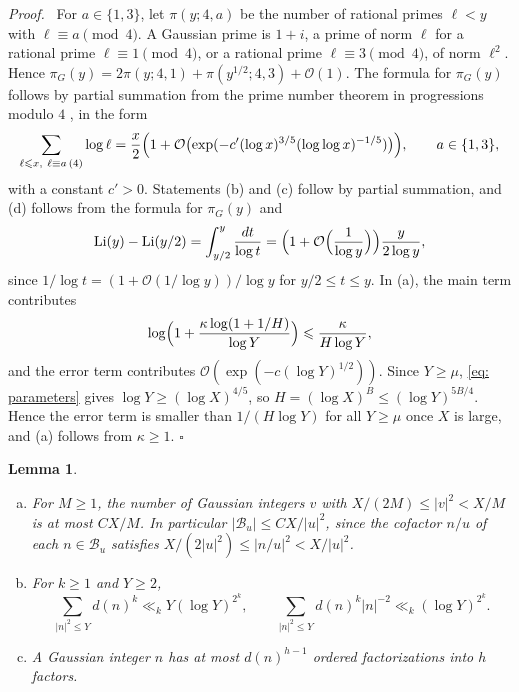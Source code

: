\documentclass{article}
\numberwithin{equation}{section}
\newtheorem{lemma}{Lemma}
\newenvironment{proof}[1][Proof]{\par\medskip\noindent\textit{#1.}\ }{\hfill$\square$\par\medskip}
\newcommand{\Le}{\leqslant}
\newcommand{\Ge}{\geqslant}
\begin{document}
\begin{proof}
For $a \in \{1, 3\}$, let $\pi(y; 4, a)$ be the number of rational primes $\ell < y$ with $\ell \equiv a \pmod 4$. A Gaussian prime is $1 + i$, a prime of norm $\ell$ for a rational prime $\ell \equiv 1 \pmod 4$, or a rational prime $\ell \equiv 3 \pmod 4$, of norm $\ell^2$. Hence $\pi_G(y) = 2\pi(y; 4, 1) + \pi(y^{1/2}; 4, 3) + \mathcal{O}(1)$. The formula for $\pi_G(y)$ follows by partial summation from the prime number theorem in progressions modulo $4$ \citep[Section~1.2]{thorner2024refinements}, in the form
\begin{equation*}
\sum_{\ell \Le x,\ \ell \equiv a \,(4)} \log \ell = \frac{x}{2} \Bigl( 1 + \mathcal{O}\bigl( \exp(-c' (\log x)^{3/5} (\log\log x)^{-1/5}) \bigr) \Bigr), \qquad a \in \{1, 3\},
\end{equation*}
with a constant $c' > 0$. Statements (b) and (c) follow by partial summation, and (d) follows from the formula for $\pi_G(y)$ and
\begin{equation*}
\mathrm{Li}(y) - \mathrm{Li}(y/2) = \int_{y/2}^{y} \frac{dt}{\log t} = \Bigl( 1 + \mathcal{O}\Bigl( \frac{1}{\log y} \Bigr) \Bigr) \frac{y}{2\log y},
\end{equation*}
since $1/\log t = (1 + \mathcal{O}(1/\log y))/\log y$ for $y/2 \Le t \Le y$. In (a), the main term contributes
\begin{equation*}
\log\Bigl( 1 + \frac{\kappa \log(1 + 1/H)}{\log Y} \Bigr) \Le \frac{\kappa}{H \log Y},
\end{equation*}
and the error term contributes $\mathcal{O}(\exp(-c (\log Y)^{1/2}))$. Since $Y \Ge \mu$, \eqref{eq: parameters} gives $\log Y \Ge (\log X)^{4/5}$, so $H = (\log X)^B \Le (\log Y)^{5B/4}$. Hence the error term is smaller than $1/(H \log Y)$ for all $Y \Ge \mu$ once $X$ is large, and (a) follows from $\kappa \Ge 1$.
\end{proof}

\begin{lemma}
\label{lem: counting}
\begin{enumerate}[(a)]
\item For $M \Ge 1$, the number of Gaussian integers $v$ with $X/(2M) \Le |v|^2 < X/M$ is at most $C X/M$. In particular $|\mathcal{B}_u| \Le C X/|u|^2$, since the cofactor $n/u$ of each $n \in \mathcal{B}_u$ satisfies $X/(2|u|^2) \Le |n/u|^2 < X/|u|^2$.
\item For $k \Ge 1$ and $Y \Ge 2$,
\begin{equation*}
\sum_{|n|^2 \Le Y} d(n)^k \ll_k Y (\log Y)^{2^k}, \qquad \sum_{|n|^2 \Le Y} d(n)^k |n|^{-2} \ll_k (\log Y)^{2^k}.
\end{equation*}
\item A Gaussian integer $n$ has at most $d(n)^{h - 1}$ ordered factorizations into $h$ factors.
\end{enumerate}
\end{lemma}
\end{document}
